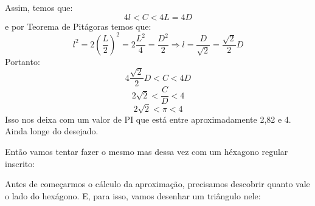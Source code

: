 \documentclass[12pt]{article}
\begin{document}
Assim, temos que: \[ 4l<C<4L=4D \] e por Teorema de Pitágoras temos que: \[l^{2}=2\left(\frac{L}{2}\right)^2=2\frac{L^2}{4}=\frac{D^2}{2}\Rightarrow l=\frac{D}{\sqrt{2}}=\frac{\sqrt{2}}{2}D\] Portanto: \[4\frac{\sqrt{2}}{2}D<C<4D\] 
          \[2\sqrt{2} < \frac{C}{D} < 4\]  
          \[2\sqrt{2} < \pi < 4\]
Isso nos deixa com um valor de PI que está entre aproximadamente 2,82 e 4. Ainda longe do desejado.
\newpage

Então vamos tentar fazer o mesmo mas dessa vez com um héxagono regular inscrito:

\begin{center}
\end{center}

Antes de começarmos o cálculo da aproximação, precisamos descobrir quanto vale o lado do hexágono. E, para isso, vamos desenhar um triângulo nele:
\end{document}
